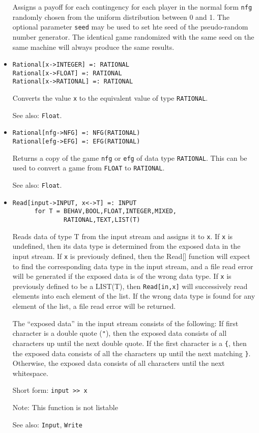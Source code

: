 \begin{itemize}
\bd
Assigns a payoff for each contingency for each player in
the normal form \verb+nfg+ randomly chosen from the uniform distribution
between 0 and 1.  The optional parameter \verb+seed+ may be used to
set hte seed of the pseudo-random number generator.  The identical game
randomized with the same seed on the same machine will always produce
the same results.
\ed

\item
\protect \large \begin{verbatim}
Rational[x->INTEGER] =: RATIONAL
Rational[x->FLOAT] =: RATIONAL
Rational[x->RATIONAL] =: RATIONAL
\end{verbatim} \normalsize

\bd
Converts the value \verb+x+ to the equivalent value of
type {\tt RATIONAL}.
\item
[See also:] {\tt Float}.
\ed

\item
\protect \large \begin{verbatim}
Rational[nfg->NFG] =: NFG(RATIONAL)
Rational[efg->EFG] =: EFG(RATIONAL)
\end{verbatim} \normalsize

\bd
Returns a copy of the game \verb+nfg+ or \verb+efg+ of data type 
{\tt RATIONAL}.  This can be used to convert a game from {\tt FLOAT}
to {\tt RATIONAL}.  
\item
[See also:] {\tt Float}.
\ed

\item
\protect \large \begin{verbatim}
Read[input->INPUT, x<->T] =: INPUT  
      for T = BEHAV,BOOL,FLOAT,INTEGER,MIXED,
              RATIONAL,TEXT,LIST(T)
\end{verbatim}\normalsize

\bd Reads data of type T from the input stream and assigns it to
\verb+x+.  If \verb+x+ is undefined, then its data type is determined
from the exposed data in the input stream.  If \verb+x+ is previously
defined, then the Read[] function will expect to find the
corresponding data type in the input stream, and a file read error
will be generated if the exposed data is of the wrong data type.  If
\verb+x+ is previously defined to be a LIST(T), then \verb+Read[in,x]+
will successively read elements into each element of the list.  If the
wrong data type is found for any element of the list, a file read
error will be returned.

The ``exposed data'' in the input stream consists of the following: If
first character is a double quote (\verb+"+), then the exposed data
consists of all characters up until the next double quote.  If the
first character is a \verb+{+, then the exposed data consists of all
the characters up until the next matching \verb+}+.  Otherwise, the
exposed data consists of all characters until the next whitespace.
\item
[Short form:] \verb+input >> x+
\item
[Note:] This function is not listable
\item
[See also:] {\tt Input},  {\tt Write}
\ed


\end{itemize}
